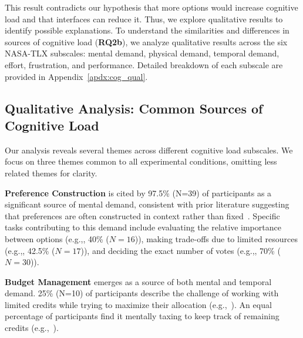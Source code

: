 This result contradicts our hypothesis that more options would increase cognitive load and that interfaces can reduce it. Thus, we explore qualitative results to identify possible explanations. To understand the similarities and differences in sources of cognitive load (\textbf{RQ2b}), we analyze qualitative results across the six NASA-TLX subscales: mental demand, physical demand, temporal demand, effort, frustration, and performance. Detailed breakdown of each subscale are provided in Appendix~\ref{apdx:cog_qual}.

\subsection{Qualitative Analysis: Common Sources of Cognitive Load}
\label{sec:cog_common}
Our analysis reveals several themes across different cognitive load subscales. We focus on three themes common to all experimental conditions, omitting less related themes for clarity.

\textbf{Preference Construction} is cited by 97.5\% (N=39) of participants as a significant source of mental demand, consistent with prior literature suggesting that preferences are often constructed in context rather than fixed~\cite{lichtensteinConstructionPreference2006}. Specific tasks contributing to this demand include evaluating the relative importance between options (e.g.,, 40\% ($N=16$)), making trade-offs due to limited resources (e.g.,, 42.5\% ($N=17$)), and deciding the exact number of votes (e.g.,, 70\% ($N=30$)).

\textbf{Budget Management} emerges as a source of both mental and temporal demand. 25\% (N=10) of participants describe the challenge of working with limited credits while trying to maximize their allocation (e.g.,~). An equal percentage of participants find it mentally taxing to keep track of remaining credits (e.g.,~).

